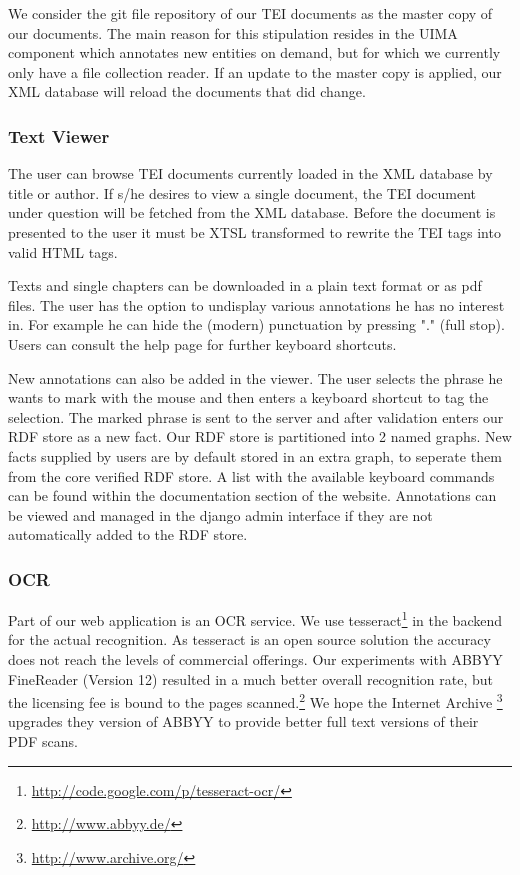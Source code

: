 \documentclass[12pt, draft]{article}
\begin{document}
We consider the git file repository of our TEI documents as the master copy
of our documents.  The main reason for this stipulation resides in the
UIMA component which annotates new entities on demand, but for which we
currently only have a file collection reader.  If an update to the master copy
is applied, our XML database will reload the documents that did change.

\subsubsection{Text Viewer}

The user can browse TEI documents currently loaded in the XML database by title
or author.  If s/he desires to view a single document, the TEI document under question
will be fetched from the XML database.  Before the document is presented to the
user it must be XTSL transformed to rewrite the TEI tags into valid HTML
tags.

Texts and single chapters can be downloaded in a plain text format or as pdf files.
The user has the option to undisplay various annotations he has no interest in. For example
he can hide the (modern) punctuation by pressing "." (full stop).  Users can consult the
help page for further keyboard shortcuts.

New annotations can also be added in the viewer. The user selects the phrase he wants
to mark with the mouse and then enters a keyboard shortcut to tag the selection.
The marked phrase is sent to the server and after validation enters
our RDF store as a new fact.  Our RDF store is partitioned into 2 named graphs.
New facts supplied by users are by default stored in an extra graph, to seperate them
from the core verified RDF store.  A list with the available keyboard commands
can be found within the documentation section of the website.
Annotations can be viewed and managed in the django admin interface if they are not
automatically added to the RDF store.

\subsubsection{OCR}

Part of our web application is an OCR service.  We use tesseract\footnote{\url{http://code.google.com/p/tesseract-ocr/}}
 in the backend for the
actual recognition.  As tesseract is an open source solution the accuracy does not
reach the levels of commercial offerings.  Our experiments with ABBYY FineReader (Version 12)
resulted in a much better overall recognition rate, but the licensing fee is bound
to the pages scanned.\footnote{\url{http://www.abbyy.de/}}
We hope the Internet Archive \footnote{\url{http://www.archive.org/}} upgrades they version of ABBYY to provide better full text
versions of their PDF scans.
\end{document}
